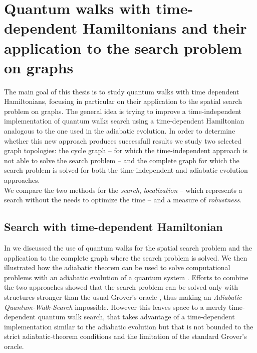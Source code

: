 \newpage
\thispagestyle{empty}
\singlespacing
\chapter[Quantum walks with time-dependent Hamiltonians]{\textbf{Quantum walks with time-dependent Hamiltonians and their application to the search problem on graphs}}
\onehalfspacing
The main goal of this thesis is to study quantum walks with time dependent Hamiltonians, focusing in particular on their application to the spatial search problem on graphs. The general idea is trying to improve a time-independent implementation of quantum walks search using a time-dependent Hamiltonian analogous to the one used in the adiabatic evolution. In order to determine whether this new approach produces successfull results we study two selected graph topologies: the cycle graph -- for which the time-independent approach is not able to solve the search problem -- and the complete graph for which the search problem is solved for both the time-independent and adiabatic evolution approaches. \\ We compare the two methods for the \textit{search}, \textit{localization} -- which represents a search without the needs to optimize the time -- and a measure of \textit{robustness}.

\section{Search with time-dependent Hamiltonian}
In  we discussed the use of quantum walks for the spatial search problem \cite{Childs2004} and the application to the complete graph where the search problem is solved. We then illustrated how the adiabatic theorem can be used to solve computational problems with an adiabatic evolution of a quantum system \cite{Farhi2000}. Efforts to combine the two approaches showed that the search problem can be solved only with structures stronger than the usual Grover's oracle \cite{Wong2016}, thus making an \textit{Adiabatic-Quantum-Walk-Search} impossible. However this leaves space to a merely time-dependent quantum walk search, that takes advantage of a time-dependent implementation similar to the adiabatic evolution but that is not bounded to the strict adiabatic-theorem conditions and the limitation of the standard Grover's oracle.


